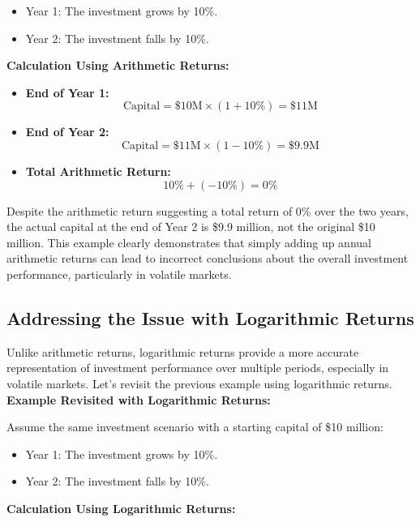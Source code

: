 \documentclass{article}
\begin{document}
\begin{itemize}
    \item Year 1: The investment grows by 10\%.
    \item Year 2: The investment falls by 10\%.
\end{itemize}

\textbf{Calculation Using Arithmetic Returns:}

\begin{itemize}
    \item \textbf{End of Year 1:}
      \[ \text{Capital} = \$10\text{M} \times (1 + 10\%) = \$11\text{M} \]
    \item \textbf{End of Year 2:}
      \[ \text{Capital} = \$11\text{M} \times (1 - 10\%) = \$9.9\text{M} \]
    \item \textbf{Total Arithmetic Return:}
      \[ 10\% + (-10\%) = 0\% \]
\end{itemize}

Despite the arithmetic return suggesting a total return of 0\% over the two years, the actual capital at the end of Year 2 is \$9.9 million, not the original \$10 million. This example clearly demonstrates that simply adding up annual arithmetic returns can lead to incorrect conclusions about the overall investment performance, particularly in volatile markets.

\subsection{Addressing the Issue with Logarithmic Returns}

Unlike arithmetic returns, logarithmic returns provide a more accurate representation of investment performance over multiple periods, especially in volatile markets. Let's revisit the previous example using logarithmic returns. \\

\textbf{Example Revisited with Logarithmic Returns:}

Assume the same investment scenario with a starting capital of \$10 million:

\begin{itemize}
    \item Year 1: The investment grows by 10\%.
    \item Year 2: The investment falls by 10\%.
\end{itemize}

\textbf{Calculation Using Logarithmic Returns:}
\end{document}
